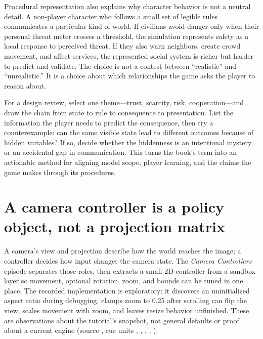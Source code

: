 Procedural representation also explains why character behavior is not a neutral detail. A non-player character who follows a small set of legible rules communicates a particular kind of world. If civilians avoid danger only when their personal threat meter crosses a threshold, the simulation represents safety as a local response to perceived threat. If they also warn neighbors, create crowd movement, and affect services, the represented social system is richer but harder to predict and validate. The choice is not a contest between ``realistic'' and ``unrealistic.'' It is a choice about which relationships the game asks the player to reason about.

For a design review, select one theme---trust, scarcity, risk, cooperation---and draw the chain from state to rule to consequence to presentation. List the information the player needs to predict the consequence, then try a counterexample: can the same visible state lead to different outcomes because of hidden variables? If so, decide whether the hiddenness is an intentional mystery or an accidental gap in communication. This turns the book's term into an actionable method for aligning model scope, player learning, and the claims the game makes through its procedures.

\section{A camera controller is a policy object, not a projection matrix}\label{06-engine-ii-ch046-a-camera-controller-is-a-policy-object-not-a-projection-matrix}

\hypertarget{06-engine-ii-ch046-a-camera-controller-is-a-policy-object-not-a-projection-matrix}{}

A camera's view and projection describe how the world reaches the image; a controller decides how input changes the camera state. The \emph{Camera Controllers} episode separates those roles, then extracts a small 2D controller from a sandbox layer so movement, optional rotation, zoom, and bounds can be tuned in one place. The recorded implementation is exploratory: it discovers an uninitialized aspect ratio during debugging, clamps zoom to 0.25 after scrolling can flip the view, scales movement with zoom, and leaves resize behavior unfinished. These are observations about the tutorial's snapshot, not general defaults or proof about a current engine (source , cue units , , , , ).

